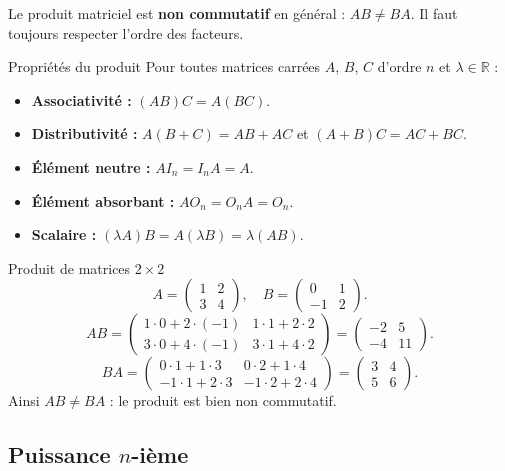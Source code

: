 \begin{attention}
	Le produit matriciel est \textbf{non commutatif} en général :
	$AB \neq BA$. Il faut toujours respecter l'ordre des facteurs.
\end{attention}

\begin{propriete}{Propriétés du produit}
	Pour toutes matrices carrées $A$, $B$, $C$ d'ordre $n$ et $\lambda\in\mathbb{R}$ :
	\begin{itemize}
		\item \textbf{Associativité :} $(AB)C = A(BC)$.
		\item \textbf{Distributivité :} $A(B+C)=AB+AC$ et $(A+B)C=AC+BC$.
		\item \textbf{Élément neutre :} $AI_n = I_nA = A$.
		\item \textbf{Élément absorbant :} $AO_n = O_nA = O_n$.
		\item \textbf{Scalaire :} $(\lambda A)B = A(\lambda B) = \lambda(AB)$.
	\end{itemize}
\end{propriete}

\begin{exemple}{Produit de matrices $2\times 2$}
	\[
	A=\begin{pmatrix}1&2\\3&4\end{pmatrix},\quad
	B=\begin{pmatrix}0&1\\-1&2\end{pmatrix}.
	\]
	\[
	AB = \begin{pmatrix}1\cdot0+2\cdot(-1) & 1\cdot1+2\cdot2\\
		3\cdot0+4\cdot(-1) & 3\cdot1+4\cdot2\end{pmatrix}
	= \begin{pmatrix}-2&5\\-4&11\end{pmatrix}.
	\]
	\[
	BA = \begin{pmatrix}0\cdot1+1\cdot3 & 0\cdot2+1\cdot4\\
		-1\cdot1+2\cdot3 & -1\cdot2+2\cdot4\end{pmatrix}
	= \begin{pmatrix}3&4\\5&6\end{pmatrix}.
	\]
	Ainsi $AB \neq BA$ : le produit est bien non commutatif.
\end{exemple}

\subsection{Puissance $n$-ième}

